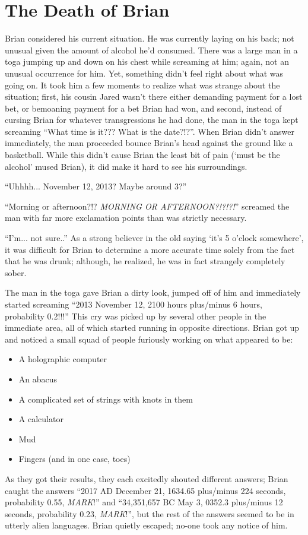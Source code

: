 
\chapter{The Death of Brian}

Brian considered his current situation.  He was currently laying on his back;
not unusual given the amount of alcohol he'd consumed.  There was a large man in
a toga jumping up and down on his chest while screaming at him; again, not an
unusual occurrence for him.  Yet, something didn't feel right about what was
going on.  It took him a few moments to realize what was strange about the
situation; first, his cousin Jared wasn't there either demanding payment for a
lost bet, or bemoaning payment for a bet Brian had won, and second, instead of
cursing Brian for whatever transgressions he had done, the man in the toga kept
screaming ``What time is it??? What is the date?!?''. When Brian didn't answer
immediately, the man proceeded bounce Brian's head against the ground like a
basketball.  While this didn't cause Brian the least bit of pain (`must be the
alcohol' mused Brian), it did make it hard to see his surroundings.

``Uhhhh... November 12, 2013?  Maybe around 3?'' 

``Morning or afternoon?!? \emph{MORNING OR AFTERNOON?!?!?!}'' screamed the man
with far more exclamation points than was strictly necessary.

``I'm... not sure..'' As a strong believer in the old saying `it's 5 o'clock
somewhere', it was difficult for Brian to determine a more accurate time solely
from the fact that he was drunk; although, he realized, he was in fact strangely
completely sober.

The man in the toga gave Brian a dirty look, jumped off of him and immediately
started screaming ``2013 November 12, 2100 hours plus/minus 6 hours, probability
0.2!!!''  This cry was picked up by several other people in the immediate area,
all of which started running in opposite directions.  Brian got up and noticed a
small squad of people furiously working on what appeared to be:
\begin{itemize}
    \item A holographic computer
    \item An abacus
    \item A complicated set of strings with knots in them
    \item A calculator
    \item Mud
    \item Fingers (and in one case, toes)
\end{itemize}
As they got their results, they each excitedly shouted different answers; Brian
caught the answers ``2017 AD December 21, 1634.65 plus/minus 224 seconds,
probability 0.55, \emph{MARK}!'' and ``34,351,657 BC May 3, 0352.3 plus/minus
12 seconds, probability 0.23, \emph{MARK}!'', but the rest of the answers seemed
to be in utterly alien languages.  Brian quietly escaped; no-one took any notice
of him.

